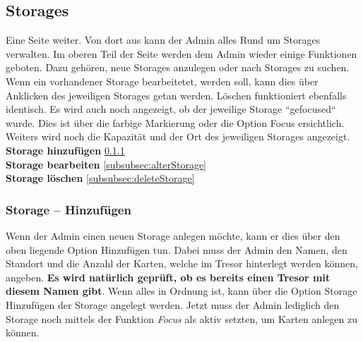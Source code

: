 \newpage

\subsection{Storages}
Eine Seite weiter. Von dort aus kann der Admin alles Rund um Storages verwalten. Im oberen Teil der Seite werden dem Admin wieder einige Funktionen geboten. Dazu gehören, neue Storages anzulegen oder nach Storages zu suchen. Wenn ein vorhandener Storage bearbeitetet, werden soll, kann dies über Anklicken des jeweiligen Storages getan werden. Löschen funktioniert ebenfalls identisch. Es wird auch noch angezeigt, ob der jeweilige Storage ``gefocused`` wurde. Dies ist über die farbige Markierung oder die Option Focus ersichtlich. Weiters wird noch die Kapazität und der Ort des jeweiligen Storages angezeigt.
\vspace{3cm}
\\
\vspace{3cm}
\textbf{Storage hinzufügen} \ref{subsubsec:addStorage}
\\
\vspace{3cm}
\textbf{Storage bearbeiten} \ref{subsubsec:alterStorage}
\\
\vspace{3cm}
\textbf{Storage löschen} \ref{subsubsec:deleteStorage}

\newpage

\subsubsection{Storage – Hinzufügen} \label{subsubsec:addStorage}
Wenn der Admin einen neuen Storage anlegen möchte, kann er dies über den oben liegende Option Hinzufügen tun. Dabei muss der Admin den Namen, den Standort und die Anzahl der Karten, welche im Tresor hinterlegt werden können, angeben. \textbf{Es wird natürlich geprüft, ob es bereits einen Tresor mit diesem Namen gibt}. Wenn alles in Ordnung ist, kann über die Option Storage Hinzufügen der Storage angelegt werden. Jetzt muss der Admin lediglich den Storage noch mittels der Funktion \textit{Focus} als aktiv setzten, um Karten anlegen zu können.

